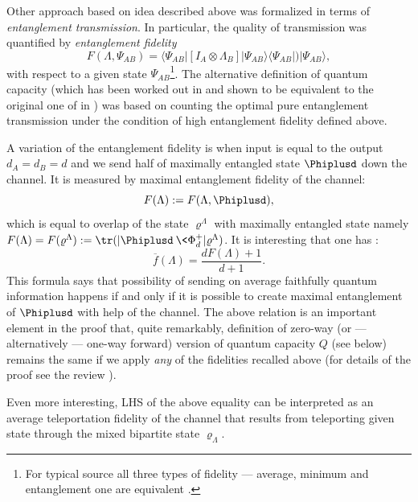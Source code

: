 \documentclass[twocolumn,aps,rmp]{revtex4}
\begin{document}
Other approach based on idea described above was formalized in
terms of {\it entanglement transmission}. In particular, the
quality of transmission was quantified by {\it entanglement fidelity}
\begin{equation}
F(\Lambda,\Psi_{AB})=\langle \Psi_{AB}| [I_{A} \otimes
\Lambda_{B}]|\Psi_{AB}\rangle \langle \Psi_{AB}|)| \Psi_{AB} \rangle,
\end{equation}
with respect to a given state $\Psi_{AB}$\footnote{For typical
source all three types of fidelity --- average, minimum and entanglement one
are equivalent \cite{BarnumKN-cap-equiv}.}.
The alternative
definition of quantum capacity (which has been worked out in
\cite{Schumach96PRA,SchumacherN-1996-pra,BarnSchumachNiels98PRA} and
shown to be equivalent to the original one of \cite{BDSW1996,BennettDS97-cap}
in \cite{BarnumKN-cap-equiv}) was based on counting the optimal pure
entanglement transmission under the condition of high entanglement
fidelity defined above.

A variation of the entanglement fidelity
\cite{ReimpellWerner} is when input is equal to the output
$d_{A}=d_{B}=d$ and we send half of maximally entangled state
$\Phiplusd$  down the channel. It is measured by maximal entanglement
fidelity of the channel:
\begin{equation}
F(\Lambda):=F(\Lambda,\Phiplusd),
\end{equation}
which is equal to overlap of the state $\varrho^{\Lambda}$ with
maximally entangled state namely
$F(\Lambda)=F(\varrho^{\Lambda}):={\tr}(|\Phiplusd\>\<\Phi^+_d|\varrho^{\Lambda})$. It is
interesting that one has \cite{gentele,NielsenFidelity}:
\begin{equation}
\overline{f}(\Lambda)=\frac{dF(\Lambda) + 1}{d+1}.
\label{GeneralFidelity}
\end{equation}
This formula says that possibility of sending on average faithfully
quantum information happens if and only if  it is possible to create
maximal entanglement of $\Phiplusd$ with help of the channel. The above
relation is an important element in the proof that, quite
remarkably, definition of zero-way (or --- alternatively --- one-way
forward) version of quantum capacity $Q$ (see below) remains the
same if we apply {\it any} of the fidelities recalled above (for details
of the proof see the review \cite{Tema}).

Even more interesting, LHS
of the above equality can be interpreted as an average
teleportation fidelity of the channel that results from teleporting
given state through the mixed bipartite state $\varrho_{\Lambda}$.
\end{document}
